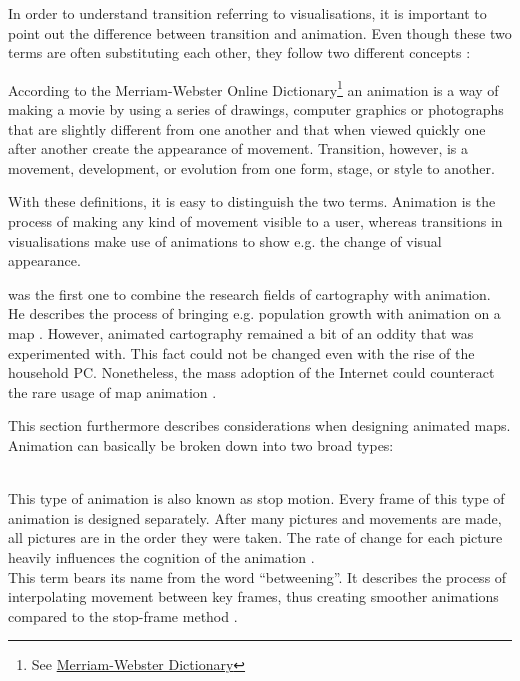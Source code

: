 In order to understand transition referring to visualisations, it is important to point out the difference between transition and animation. Even though these two terms are often substituting each other, they follow two different concepts :

According to the Merriam-Webster Online Dictionary\footnote{See \href{http://www.merriam-webster.com/}{Merriam-Webster Dictionary}} an animation is a way of making a movie by using a series of drawings, computer graphics or photographs that are slightly different from one another and that when viewed quickly one after another create the appearance of movement. Transition, however, is a movement, development, or evolution from one form, stage, or style to another.

With these definitions, it is easy to distinguish the two terms. Animation is the process of making any kind of movement visible to a user, whereas transitions in visualisations make use of animations to show e.g. the change of visual appearance.

\citeauthor{Thrower1959} was the first one to combine the research fields of cartography with animation. He describes the process of bringing e.g. population growth with animation on a map . However, animated cartography remained a bit of an oddity that was experimented with. This fact could not be changed even with the rise of the household \ac{PC}. Nonetheless, the mass adoption of the Internet could counteract the rare usage of map animation .

This section furthermore describes considerations when designing animated maps. Animation can basically be broken down into two broad types:

\begin{enumerate}
 \hfill \\
This type of animation is also known as stop motion. Every frame of this type of animation is designed separately. After many pictures and movements are made, all pictures are in the order they were taken. The rate of change for each picture heavily influences the cognition of the animation .
 \hfill \\
    This term bears its name from the word ``betweening''. It describes the process of interpolating movement between key frames, thus creating smoother animations compared to the stop-frame method .
\end{enumerate}


